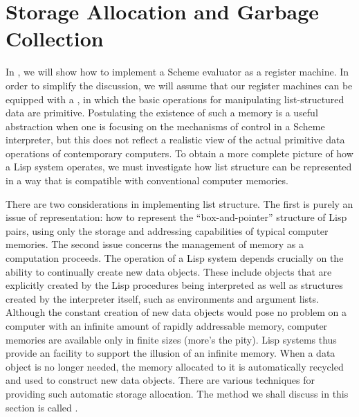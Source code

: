\section{Storage Allocation and Garbage Collection}
\label{Section 5.3}

In , we will show how to implement a Scheme evaluator as a register machine.
In order to simplify the discussion, we will assume that our register machines can be equipped with a , in which the basic operations for manipulating list-structured data are primitive.
Postulating the existence of such a memory is a useful abstraction when one is focusing on the mechanisms of control in a Scheme interpreter, but this does not reflect a realistic view of the actual primitive data operations of contemporary computers.
To obtain a more complete picture of how a Lisp system operates, we must investigate how list structure can be represented in a way that is compatible with conventional computer memories.

There are two considerations in implementing list structure.
The first is purely an issue of representation:
how to represent the “box-and-pointer” structure of Lisp pairs, using only the storage and addressing capabilities of typical computer memories.
The second issue concerns the management of memory as a computation proceeds.
The operation of a Lisp system depends crucially on the ability to continually create new data objects.
These include objects that are explicitly created by the Lisp procedures being interpreted as well as structures created by the interpreter itself, such as environments and argument lists.
Although the constant creation of new data objects would pose no problem on a computer with an infinite amount of rapidly addressable memory, computer memories are available only in finite sizes (more’s the pity).
Lisp systems thus provide an  facility to support the illusion of an infinite memory.
When a data object is no longer needed, the memory allocated to it is automatically recycled and used to construct new data objects.
There are various techniques for providing such automatic storage allocation.
The method we shall discuss in this section is called .



